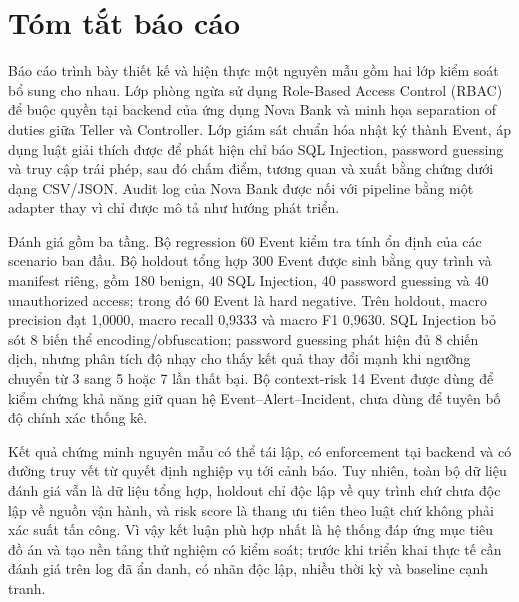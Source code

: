\chapter*{Tóm tắt báo cáo}

Báo cáo trình bày thiết kế và hiện thực một nguyên mẫu gồm hai lớp kiểm soát
bổ sung cho nhau. Lớp phòng ngừa sử dụng Role-Based Access Control (RBAC) để
buộc quyền tại backend của ứng dụng Nova Bank và minh họa separation of duties
giữa Teller và Controller. Lớp giám sát chuẩn hóa nhật ký thành Event, áp dụng
luật giải thích được để phát hiện chỉ báo SQL Injection, password guessing và
truy cập trái phép, sau đó chấm điểm, tương quan và xuất bằng chứng dưới dạng
CSV/JSON. Audit log của Nova Bank được nối với pipeline bằng một adapter thay
vì chỉ được mô tả như hướng phát triển.

Đánh giá gồm ba tầng. Bộ regression 60 Event kiểm tra tính ổn định của các
scenario ban đầu. Bộ holdout tổng hợp 300 Event được sinh bằng quy trình và
manifest riêng, gồm 180 benign, 40 SQL Injection, 40 password guessing và 40
unauthorized access; trong đó 60 Event là hard negative. Trên holdout, macro
precision đạt 1,0000, macro recall 0,9333 và macro F1 0,9630. SQL Injection
bỏ sót 8 biến thể encoding/obfuscation; password guessing phát hiện đủ 8 chiến
dịch, nhưng phân tích độ nhạy cho thấy kết quả thay đổi mạnh khi ngưỡng chuyển
từ 3 sang 5 hoặc 7 lần thất bại. Bộ context-risk 14 Event được dùng để kiểm
chứng khả năng giữ quan hệ Event--Alert--Incident, chưa dùng để tuyên bố độ
chính xác thống kê.

Kết quả chứng minh nguyên mẫu có thể tái lập, có enforcement tại backend và có
đường truy vết từ quyết định nghiệp vụ tới cảnh báo. Tuy nhiên, toàn bộ dữ liệu
đánh giá vẫn là dữ liệu tổng hợp, holdout chỉ độc lập về quy trình chứ chưa độc
lập về nguồn vận hành, và risk score là thang ưu tiên theo luật chứ không phải
xác suất tấn công. Vì vậy kết luận phù hợp nhất là hệ thống đáp ứng mục tiêu
đồ án và tạo nền tảng thử nghiệm có kiểm soát; trước khi triển khai thực tế cần
đánh giá trên log đã ẩn danh, có nhãn độc lập, nhiều thời kỳ và baseline cạnh
tranh.
